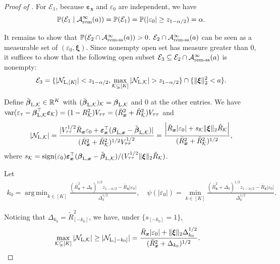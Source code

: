 \documentclass[12pt]{article}
\newcommand{\Lin}{\textnormal{L}}
\newcommand{\Prob}{\mathbb{P}}
\newcommand{\var}{\operatorname{var}}
\newcommand{\mk}{\mathcal{K}}
\newcommand{\rem}{\textnormal{rem}}
\newcommand{\remss}{\textnormal{rem-ss}}
\newcommand{\bs}{\boldsymbol}
\DeclareMathOperator*{\argmin}{arg\,min}
\begin{document}
\begin{proof}[Proof of ]
For $\mathcal{E}_1$, because $\bs{\varepsilon}_{\bs{x}}$ and $\varepsilon_0$ are independent, we have
\[
\Prob(\mathcal{E}_1\mid\mathcal{A}_{\rem}^{\infty}(a)) = \Prob(\mathcal{E}_1) = \Prob(|\varepsilon_0|\geq z_{1-\alpha/2}) = \alpha.
\]

It remains to show that $\Prob(\mathcal{E}_2\cap\mathcal{A}_{\remss}^{\infty}(a))>0$. $\mathcal{E}_2\cap\mathcal{A}_{\remss}^{\infty}(a)$ can be seen as a measurable set of $(\varepsilon_0,\bs{\xi})$.  Since nonempty open set has measure greater than $0$, it suffices to show that the following open subset $\mathcal{E}_3 \subseteq \mathcal{E}_2\cap\mathcal{A}_{\remss}^{\infty}(a)$ is nonempty: 
\[
\mathcal{E}_3 =\{|\mathcal{N}_{\Lin, [K]}|< z_{1-\alpha/2}, \max_{\mk \subsetneq [K]} |\mathcal{N}_{\Lin, \mk}| > z_{1-\alpha/2} \} \cap \{ \|\bs{\xi}\|_2^2 <a\}. 
\]

 Define $\tilde{\bs{\beta}}_{\Lin,\mk}\in \mathbb{R}^K$ with $(\tilde{\bs{\beta}}_{\Lin,\mk})_{\mk} = \bs{\beta}_{\Lin,\mk}$ and $0$ at the other entries. We have $\var(\varepsilon_{\tau}-\bs{\beta}_{\Lin, \mk}^\top \bs{\varepsilon}_{\mk}) = (1-R^2_{\mk}) V_{\tau\tau} = (\bar{R}^2_{\bs{x}}+\tilde{R}_{\mk}^2) V_{\tau\tau}$ and
\[
|\mathcal{N}_{\Lin,\mk}| = \frac{|V_{\tau\tau}^{1/2}\bar{R}_{\bs{x}}\varepsilon_0 + \bs{\varepsilon}_{\bs{x}}^\top (\bs{\beta}_{\Lin, \bs{x}}-\tilde{\bs{\beta}}_{\Lin,\mk})|}{(\bar{R}^2_{\bs{x}}+\tilde{R}_{\mk}^2)^{1/2}V_{\tau\tau}^{1/2}} = \frac{\Big|\bar{R}_{\bs{x}}|\varepsilon_0|+s_{\mk}\|\bs{\xi}\|_2 \tilde{R}_{\mk}\Big|}{(\bar{R}_{\bs{x}}^2 + \tilde{R}^2_{\mk})^{1/2}},
\]
 where $s_{\mk} = \operatorname{sign}(\varepsilon_{0})\bs{\varepsilon}_{\bs{x}}^\top (\bs{\beta}_{\Lin, \bs{x}}-\tilde{\bs{\beta}}_{\Lin,\mk})/(V_{\tau\tau}^{1/2}\|\bs{\xi}\|_2\tilde{R}_{\mk})$.

Let 
\begin{align*}
    k_0 = \argmin_{k \in [K]} \frac{(\bar{R}_{\bs{x}}^2 + \Delta_{k})^{1/2}z_{1-\alpha/2}-\bar{R}_{\bs{x}}|\varepsilon_0|}{\Delta_{k}^{1/2}},\quad \psi(|\varepsilon_0|)  = \min_{k\in [K]} \frac{(\bar{R}_{\bs{x}}^2 + \Delta_{k})^{1/2}z_{1-\alpha/2}-\bar{R}_{\bs{x}}|\varepsilon_0|}{\Delta_{k}^{1/2}} .
\end{align*}


Noticing that $\Delta_{k_0} = \tilde{R}^2_{[-k_0]}$, we have, under $\{s_{[-k_0]}=1\}$,
\begin{align*}
    \max_{\mk \subsetneq [K]} |\mathcal{N}_{\Lin, \mk}| &\geq |\mathcal{N}_{\Lin, [-k_0]}| = \frac{\bar{R}_{\bs{x}}|\varepsilon_0|+\|\bs{\xi}\|_2 \Delta_{k_0}^{1/2} }{(\bar{R}_{\bs{x}}^2 + \Delta_{k_0})^{1/2}}.
\end{align*}


\end{proof}
\end{document}

